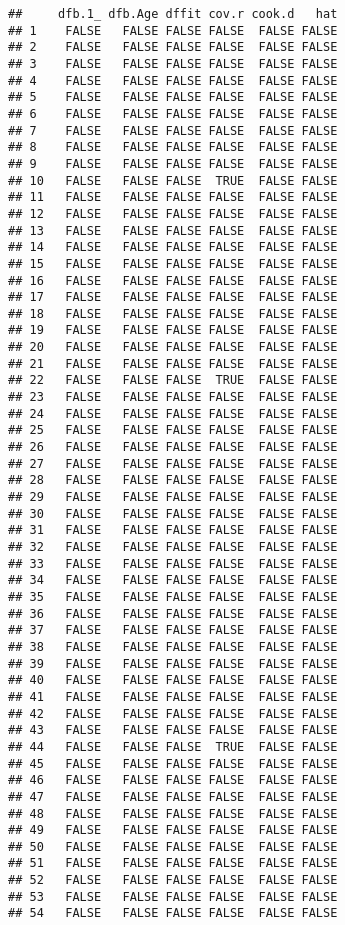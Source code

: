 \documentclass[
]{article}
\begin{document}
\begin{verbatim}
##     dfb.1_ dfb.Age dffit cov.r cook.d   hat
## 1    FALSE   FALSE FALSE FALSE  FALSE FALSE
## 2    FALSE   FALSE FALSE FALSE  FALSE FALSE
## 3    FALSE   FALSE FALSE FALSE  FALSE FALSE
## 4    FALSE   FALSE FALSE FALSE  FALSE FALSE
## 5    FALSE   FALSE FALSE FALSE  FALSE FALSE
## 6    FALSE   FALSE FALSE FALSE  FALSE FALSE
## 7    FALSE   FALSE FALSE FALSE  FALSE FALSE
## 8    FALSE   FALSE FALSE FALSE  FALSE FALSE
## 9    FALSE   FALSE FALSE FALSE  FALSE FALSE
## 10   FALSE   FALSE FALSE  TRUE  FALSE FALSE
## 11   FALSE   FALSE FALSE FALSE  FALSE FALSE
## 12   FALSE   FALSE FALSE FALSE  FALSE FALSE
## 13   FALSE   FALSE FALSE FALSE  FALSE FALSE
## 14   FALSE   FALSE FALSE FALSE  FALSE FALSE
## 15   FALSE   FALSE FALSE FALSE  FALSE FALSE
## 16   FALSE   FALSE FALSE FALSE  FALSE FALSE
## 17   FALSE   FALSE FALSE FALSE  FALSE FALSE
## 18   FALSE   FALSE FALSE FALSE  FALSE FALSE
## 19   FALSE   FALSE FALSE FALSE  FALSE FALSE
## 20   FALSE   FALSE FALSE FALSE  FALSE FALSE
## 21   FALSE   FALSE FALSE FALSE  FALSE FALSE
## 22   FALSE   FALSE FALSE  TRUE  FALSE FALSE
## 23   FALSE   FALSE FALSE FALSE  FALSE FALSE
## 24   FALSE   FALSE FALSE FALSE  FALSE FALSE
## 25   FALSE   FALSE FALSE FALSE  FALSE FALSE
## 26   FALSE   FALSE FALSE FALSE  FALSE FALSE
## 27   FALSE   FALSE FALSE FALSE  FALSE FALSE
## 28   FALSE   FALSE FALSE FALSE  FALSE FALSE
## 29   FALSE   FALSE FALSE FALSE  FALSE FALSE
## 30   FALSE   FALSE FALSE FALSE  FALSE FALSE
## 31   FALSE   FALSE FALSE FALSE  FALSE FALSE
## 32   FALSE   FALSE FALSE FALSE  FALSE FALSE
## 33   FALSE   FALSE FALSE FALSE  FALSE FALSE
## 34   FALSE   FALSE FALSE FALSE  FALSE FALSE
## 35   FALSE   FALSE FALSE FALSE  FALSE FALSE
## 36   FALSE   FALSE FALSE FALSE  FALSE FALSE
## 37   FALSE   FALSE FALSE FALSE  FALSE FALSE
## 38   FALSE   FALSE FALSE FALSE  FALSE FALSE
## 39   FALSE   FALSE FALSE FALSE  FALSE FALSE
## 40   FALSE   FALSE FALSE FALSE  FALSE FALSE
## 41   FALSE   FALSE FALSE FALSE  FALSE FALSE
## 42   FALSE   FALSE FALSE FALSE  FALSE FALSE
## 43   FALSE   FALSE FALSE FALSE  FALSE FALSE
## 44   FALSE   FALSE FALSE  TRUE  FALSE FALSE
## 45   FALSE   FALSE FALSE FALSE  FALSE FALSE
## 46   FALSE   FALSE FALSE FALSE  FALSE FALSE
## 47   FALSE   FALSE FALSE FALSE  FALSE FALSE
## 48   FALSE   FALSE FALSE FALSE  FALSE FALSE
## 49   FALSE   FALSE FALSE FALSE  FALSE FALSE
## 50   FALSE   FALSE FALSE FALSE  FALSE FALSE
## 51   FALSE   FALSE FALSE FALSE  FALSE FALSE
## 52   FALSE   FALSE FALSE FALSE  FALSE FALSE
## 53   FALSE   FALSE FALSE FALSE  FALSE FALSE
## 54   FALSE   FALSE FALSE FALSE  FALSE FALSE

\end{verbatim}
\end{document}
